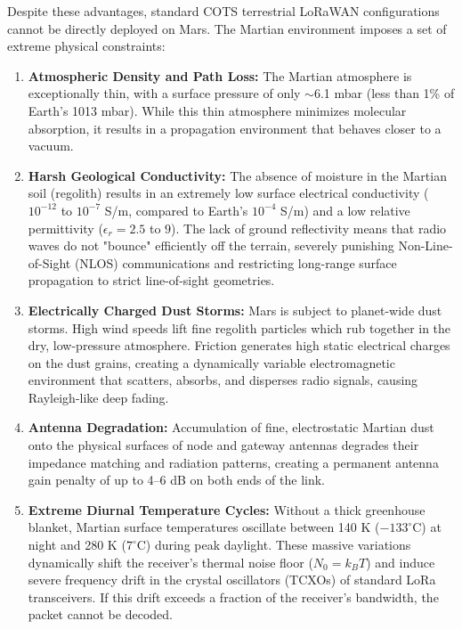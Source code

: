 \documentclass[journal,10pt,doublecolumn]{IEEEtran}
\begin{document}
Despite these advantages, standard COTS terrestrial LoRaWAN configurations cannot be directly deployed on Mars. The Martian environment imposes a set of extreme physical constraints:
\begin{enumerate}
    \item \textbf{Atmospheric Density and Path Loss:} The Martian atmosphere is exceptionally thin, with a surface pressure of only $\sim$6.1 mbar (less than 1\% of Earth's 1013 mbar). While this thin atmosphere minimizes molecular absorption, it results in a propagation environment that behaves closer to a vacuum. 
    \item \textbf{Harsh Geological Conductivity:} The absence of moisture in the Martian soil (regolith) results in an extremely low surface electrical conductivity ($10^{-12}$ to $10^{-7}$ S/m, compared to Earth's $10^{-4}$ S/m) and a low relative permittivity ($\epsilon_r = 2.5$ to $9$). The lack of ground reflectivity means that radio waves do not "bounce" efficiently off the terrain, severely punishing Non-Line-of-Sight (NLOS) communications and restricting long-range surface propagation to strict line-of-sight geometries.
    \item \textbf{Electrically Charged Dust Storms:} Mars is subject to planet-wide dust storms. High wind speeds lift fine regolith particles which rub together in the dry, low-pressure atmosphere. Friction generates high static electrical charges on the dust grains, creating a dynamically variable electromagnetic environment that scatters, absorbs, and disperses radio signals, causing Rayleigh-like deep fading.
    \item \textbf{Antenna Degradation:} Accumulation of fine, electrostatic Martian dust onto the physical surfaces of node and gateway antennas degrades their impedance matching and radiation patterns, creating a permanent antenna gain penalty of up to 4--6 dB on both ends of the link.
    \item \textbf{Extreme Diurnal Temperature Cycles:} Without a thick greenhouse blanket, Martian surface temperatures oscillate between 140 K ($-133^\circ$C) at night and 280 K ($7^\circ$C) during peak daylight. These massive variations dynamically shift the receiver's thermal noise floor ($N_0 = k_B T$) and induce severe frequency drift in the crystal oscillators (TCXOs) of standard LoRa transceivers. If this drift exceeds a fraction of the receiver's bandwidth, the packet cannot be decoded.
\end{enumerate}
\end{document}
